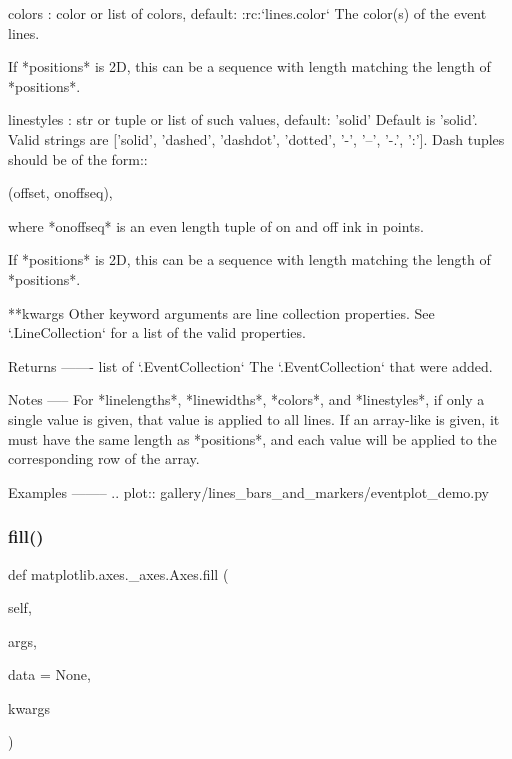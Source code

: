 \begin{DoxyVerb}
colors : color or list of colors, default: :rc:`lines.color`
    The color(s) of the event lines.

    If *positions* is 2D, this can be a sequence with length matching
    the length of *positions*.

linestyles : str or tuple or list of such values, default: 'solid'
    Default is 'solid'. Valid strings are ['solid', 'dashed',
    'dashdot', 'dotted', '-', '--', '-.', ':']. Dash tuples
    should be of the form::

(offset, onoffseq),

    where *onoffseq* is an even length tuple of on and off ink
    in points.

    If *positions* is 2D, this can be a sequence with length matching
    the length of *positions*.

**kwargs
    Other keyword arguments are line collection properties.  See
    `.LineCollection` for a list of the valid properties.

Returns
-------
list of `.EventCollection`
    The `.EventCollection` that were added.

Notes
-----
For *linelengths*, *linewidths*, *colors*, and *linestyles*, if only
a single value is given, that value is applied to all lines.  If an
array-like is given, it must have the same length as *positions*, and
each value will be applied to the corresponding row of the array.

Examples
--------
.. plot:: gallery/lines_bars_and_markers/eventplot_demo.py
\end{DoxyVerb}
 \mbox{\label{classmatplotlib_1_1axes_1_1__axes_1_1Axes_a97f36c68f65067af3a6254251f4c1018}} 
\subsubsection{\texorpdfstring{fill()}{fill()}}
{\footnotesize\ttfamily def matplotlib.\+axes.\+\_\+axes.\+Axes.\+fill (\begin{DoxyParamCaption}\item[{}]{self,  }\item[{}]{args,  }\item[{}]{data = {\ttfamily None},  }\item[{}]{kwargs }\end{DoxyParamCaption})}

